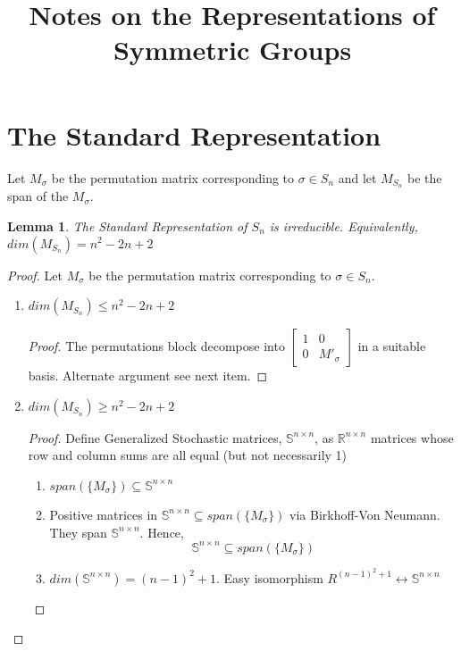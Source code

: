\documentclass{sig-alternate}
\newtheorem{lemma}[theorem]{Lemma}
\begin{document}
\title{Notes on the Representations of Symmetric Groups}
\maketitle
\section{The Standard Representation}
Let $M_{\sigma}$ be the permutation matrix corresponding to $\sigma \in S_n$ and let $M_{S_n}$ be the span of the $M_{\sigma}$.
\begin{lemma}
The Standard Representation of $S_n$ is irreducible. Equivalently, $dim(M_{S_n}) = n^2 -2n + 2$
\end{lemma}
\begin{proof}
Let $M_{\sigma}$ be the permutation matrix corresponding to $\sigma \in S_n$.
\begin{enumerate}
\item $dim(M_{S_n}) \leq n^2 - 2n + 2$
\begin{proof}
The permutations block decompose into $\left[ \begin{array}{cc} 1 & 0 \\ 0 & M'_{\sigma} \end{array} \right]$ in a suitable basis. Alternate argument see next item.
\end{proof}
\item $dim(M_{S_n}) \geq n^2 - 2n + 2$
\begin{proof}
Define Generalized Stochastic matrices, $\mathbb{S}^{n\times n}$, as $\mathbb{R}^{n\times n}$ matrices whose row and column sums are all equal (but not necessarily 1)
\begin{enumerate}
\item $span(\{M_{\sigma}\}) \subseteq \mathbb{S}^{n\times n}$ 
\item Positive matrices in $\mathbb{S}^{n\times n} \subseteq span(\{M_{\sigma}\})$ via Birkhoff-Von Neumann. They span $\mathbb{S}^{n\times n}$. Hence, \[\mathbb{S}^{n\times n} \subseteq span(\{M_{\sigma}\})\]
\item $dim(\mathbb{S}^{n\times n}) = (n-1)^2 + 1$. Easy isomorphism $R^{(n-1)^2 + 1} \leftrightarrow \mathbb{S}^{n\times n}$
\end{enumerate}
\end{proof}
\end{enumerate}
\end{proof}
\end{document}
